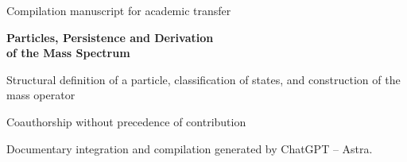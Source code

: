 \thispagestyle{plain}
\begin{center}
{\fontsize{10}{12}\selectfont Compilation manuscript for academic transfer\par}
\vspace{12mm}
{\fontsize{17}{20.5}\selectfont\bfseries Particles, Persistence and Derivation\\
of the Mass Spectrum\par}
\vspace{6pt}
{\fontsize{11}{13.5}\selectfont Structural definition of a particle, classification of states, and construction of the mass operator\par}
\vspace{11pt}
{\fontsize{11.5}{14}\selectfont\Autores\par}
\vspace{4pt}
{\fontsize{8}{10}\selectfont Coauthorship without precedence of contribution\par}
\vspace{3pt}
{\fontsize{7.5}{9.5}\selectfont Documentary integration and compilation generated by ChatGPT -- Astra.\par}
\end{center}
\vspace{7pt}
